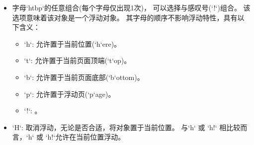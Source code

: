   \begin{itemize}
	   \item 字母`htbp`的任意组合(每个字母仅出现1次)，
		   可以选择与感叹号(`!`)组合。
		   该选项意味着该对象是一个浮动对象。
		   其字母的顺序不影响浮动特性，具有以下含义：
     \begin{itemize}
		 \item `h`: 允许置于当前位置(`h`ere)。
		 \item `t`: 允许置于当前页面顶端(`t`op)。
		 \item `b`: 允许置于当前页面底部(`b`ottom)。
		 \item `p`: 允许置于浮动页(`p`age)。
		 \item `!`: 。
     \end{itemize}
 \item `H`: 取消浮动，无论是否合适，将对象置于当前位置。
      与`h` 或 `h!` 相比较而言，`h` 或 `h!`允许在当前位置浮动。

\end{itemize}
